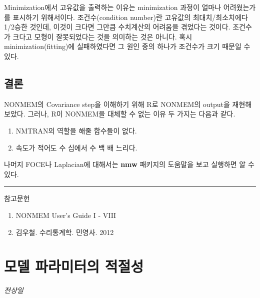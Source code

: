 \documentclass[
  10pt,
]{krantz}
\providecommand{\tightlist}{%
  \setlength{\itemsep}{0pt}\setlength{\parskip}{0pt}}
\begin{document}
Minimization에서 고유값을 출력하는 이유는 minimization 과정이 얼마나 어려웠는가를 표시하기 위해서이다. 조건수(condition number)란 고유값의 최대치/최소치에다 1/2승한 것인데, 이것이 크다면 그만큼 수치계산의 어려움을 겪었다는 것이다. 조건수가 크다고 모형이 잘못되었다는 것을 의미하는 것은 아니다. 혹시 minimization(fitting)에 실패하였다면 그 원인 중의 하나가 조건수가 크기 때문일 수 있다.

\hypertarget{uxacb0uxb860}{%
\section{결론}\label{uxacb0uxb860}}

NONMEM의 Covariance step을 이해하기 위해 R로 NONMEM의 output을 재현해 보았다. 그러나, R이
NONMEM을 대체할 수 없는 이유 두 가지는 다음과 같다.

\begin{enumerate}
\def\labelenumi{\arabic{enumi}.}
\tightlist
\item
  NMTRAN의 역할을 해줄 함수들이 없다.
\item
  속도가 적어도 수 십에서 수 백 배 느리다.
\end{enumerate}

나머지 FOCE나 Laplacian에 대해서는 \textbf{nmw} 패키지의 도움말을 보고 실행하면 알 수 있다.

\begin{center}\rule{0.5\linewidth}{0.5pt}\end{center}

참고문헌

\begin{enumerate}
\def\labelenumi{\arabic{enumi}.}
\tightlist
\item
  NONMEM User's Guide I - VIII
\item
  김우철. 수리통계학. 민영사. 2012
\end{enumerate}

\hypertarget{uxbaa8uxb378-uxd30cuxb77cuxbbf8uxd130uxc758-uxc801uxc808uxc131}{%
\chapter{모델 파라미터의 적절성}\label{uxbaa8uxb378-uxd30cuxb77cuxbbf8uxd130uxc758-uxc801uxc808uxc131}}

\emph{전상일}
\end{document}
